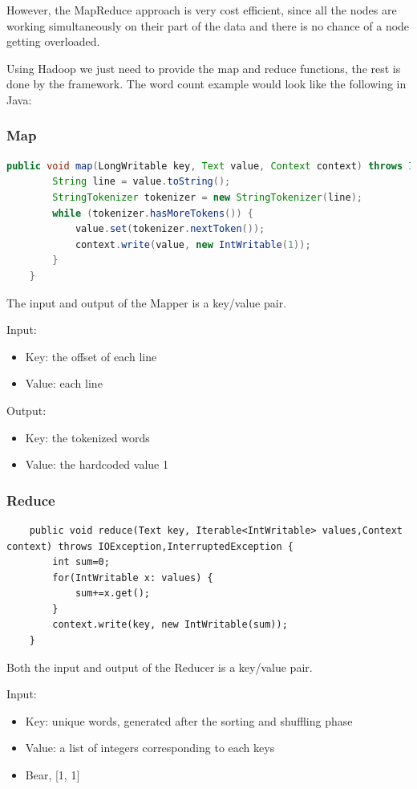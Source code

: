However, the MapReduce approach is very cost efficient, since all the nodes are working simultaneously on their part of the data and there is no chance of a node getting overloaded.

Using Hadoop we just need to provide the map and reduce functions, the rest is done by the framework.  The word count example would look like the following in Java:
\subsubsection{Map}
\begin{lstlisting}[language=Java]
	public void map(LongWritable key, Text value, Context context) throws IOException,InterruptedException {
		String line = value.toString();
		StringTokenizer tokenizer = new StringTokenizer(line);
		while (tokenizer.hasMoreTokens()) {
			value.set(tokenizer.nextToken());
			context.write(value, new IntWritable(1));
		}
	}
\end{lstlisting}
The input and output of the Mapper is a key/value pair. 

\noindent Input:
\begin{itemize}
	\item Key: the offset of each line
	\item Value: each line
\end{itemize}

\noindent Output:
\begin{itemize}
	\item Key: the tokenized words
	\item Value: the hardcoded value 1
\end{itemize}

\subsubsection{Reduce}
\begin{lstlisting}
	public void reduce(Text key, Iterable<IntWritable> values,Context context) throws IOException,InterruptedException {
		int sum=0;
		for(IntWritable x: values) {
			sum+=x.get();
		}
		context.write(key, new IntWritable(sum));
	}
\end{lstlisting}
Both the input and output of the Reducer is a key/value pair. 

\noindent Input:
\begin{itemize}
	\item Key: unique words, generated after the sorting and shuffling phase
	\item Value: a list of integers corresponding to each keys
	\item \eg Bear, [1, 1]
\end{itemize}

